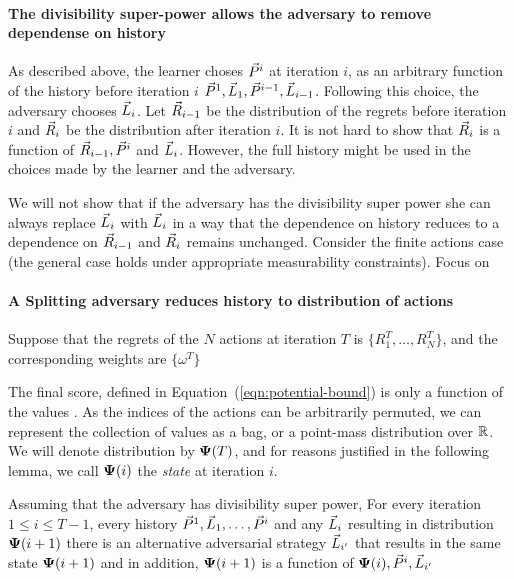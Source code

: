 \documentclass{article}[12pt]
\begin{document}
\paragraph{The divisibility super-power allows the adversary to
  remove dependense on history}
As described above, the learner choses $\vec{P}^{i}$ at iteration $i$, 
as an arbitrary function of the history before iteration $i$
$\vec{P}^{1},\vec{L}_{1},\vec{P}^{i-1},\vec{L}_{i-1}$. Following this choice, the adversary chooses $\vec{L}_{i}$.
Let $\vec{R}_{i-1}$ be the distribution of the regrets before iteration $i$ and $\vec{R}_{i}$
be the distribution after iteration $i$. It is not hard to show that $\vec{R}_{i}$ is a function of
$\vec{R}_{i-1}, \vec{P}^{i}$ and $\vec{L}_{i}$. However, the full history might be used in the choices
made by the learner and the adversary.

We will not show that if the adversary has the divisibility super
power she can always replace $\vec{L}_{i}$ with $\vec{L}_{i}$ in a way that
the dependence on history reduces to a dependence on $\vec{R}_{i-1}$ and
$\vec{R}_{i}$ remains unchanged. Consider the finite actions case (the
general case holds under appropriate measurability constraints). Focus
on


\paragraph*{A Splitting adversary reduces history to distribution of actions}
Suppose that the regrets of the $N$ actions at iteration $T$ is
$\{R_1^T,\ldots,R_N^T\}$, and the corresponding weights are $\{\omega^T\}$

The final score, defined in Equation~(\ref{eqn:potential-bound}) is
only a function of the values .  As the
indices of the actions can be arbitrarily permuted, we can represent
the collection of values as a bag, or a point-mass distribution over
$\mathbb{R}$. We will denote distribution by ${\bf \Psi}(T)$, and for reasons justified in the following lemma, we call ${\bf \Psi}(i)$ the {\em state} at iteration $i$. 

\begin{lemma}
  Assuming that the adversary has divisibility super power, For every
  iteration $1\leq i \leq T-1$, every history
  $\vec{P}^{1},\vec{L}_{1},\ldots,\vec{P}^{i}$ and any $\vec{L}_{i}$ resulting in
  distribution ${\bf \Psi}(i+1)$ there is an alternative adversarial
  strategy $\vec{L}_{i'}$ that results in the same state ${\bf \Psi}(i+1)$
  and in addition, ${\bf \Psi}(i+1)$ is a function of
  ${\bf \Psi}(i),\vec{P}^{i},\vec{L}_{i'}$
\end{lemma}
\end{document}
